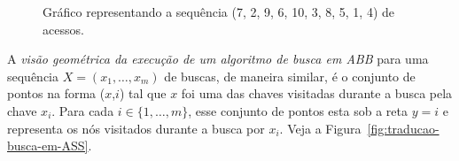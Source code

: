 \begin{figure}
    \caption{Gráfico representando a sequência (7, 2, 9, 6, 10, 3, 8, 5, 1, 4) de acessos.}
\label{fig:busca_padrao}
\end{figure}

A \textit{visão geométrica da execução de um algoritmo de busca em ABB} para uma sequência $X = (x_{1},\ldots,x_{m})$ de buscas, de maneira similar, é o conjunto de pontos na forma ($x$,$i$) tal que $x$ foi uma das chaves visitadas durante a busca pela chave $x_i$. Para cada $i \in \{1,\ldots,m\}$, esse conjunto de pontos esta sob a reta $y = i$ e representa os nós visitados durante a busca por $x_i$. Veja a Figura~\ref{fig:traducao-busca-em-ASS}.

